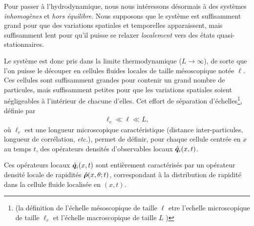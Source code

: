 \smallskip

Pour passer à l’hydrodynamique, nous nous intéressons désormais à des systèmes \emph{inhomogènes} et \emph{hors équilibre}. Nous supposons que le système est suffisamment grand pour que des variations spatiales et temporelles apparaissent, mais suffisamment lent pour qu’il puisse se relaxer \emph{localement} vers des états quasi-stationnaires.



\smallskip

Le système est donc pris dans la limite thermodynamique ($L \to \infty$), de sorte que l’on puisse le découper en cellules fluides locales de taille mésoscopique notée $\ell$. Ces cellules sont suffisamment grandes pour contenir un grand nombre de particules, mais suffisamment petites pour que les variations spatiales soient négligeables à l’intérieur de chacune d’elles. Cet effort de séparation d’échelles\footnote{(\ie la définition de l'échelle mésoscopique de taille $\ell$ etre l'echelle microscopique de taille $\ell_c$ et l'échelle macroscopique de taille $L$ )}, définie par
\begin{eqnarray*}
    \ell_c \ll \ell \ll L ,
\end{eqnarray*}
où $\ell_c$ est une longueur microscopique caractéristique (distance inter-particules, longueur de corrélation, \emph{etc.}), permet de définir, pour chaque cellule centrée en $x$ au temps $t$, des opérateurs densités d’observables locaux $\hat{\bm{q}}_i(x,t)$.

\smallskip

Ces opérateurs locaux $\hat{\bm{q}}_i(x,t)$ sont entièrement caractérisés par un opérateur densité locale de rapidités $\hat{\bm{\rho}}(x,\theta;t)$, correspondant à la distribution de rapidité dans la cellule fluide localisée en $(x,t)$.

